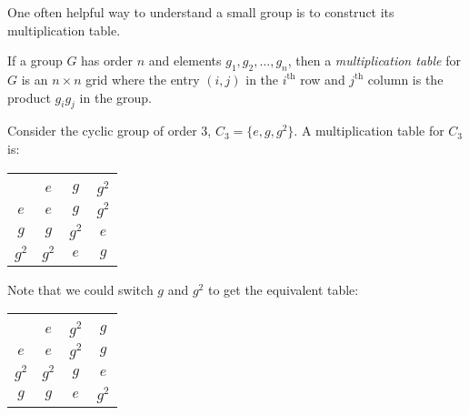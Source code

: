 



One often helpful way to understand a small group is to construct its multiplication table. 

\begin{definition}
   If a group $G$ has order $n$ and elements $g_1,g_2,\ldots,g_n$, then a \emph{multiplication table} for $G$ is an $n \times n$ grid where the entry $(i,j)$ in the $i^{\text{th}}$ row and $j^{\text{th}}$ column is the product $g_ig_j$ in the group.
\end{definition}

\begin{example}
    Consider the cyclic group of order 3, $C_3 = \{e, g, g^2 \}.$ A multiplication table for $C_3$ is:
    \begin{center}
        \begin{tabular}{c| *{3}{c}}
        \multicolumn{4}{c}{} \\
        $\text{ }$ & $e$ & $g$ & $g^2$ \\
        \hline
        $e$ &  $e$ & $g$ & $g^2$ \\
        $g$ & $g$ & $g^2$ & $e$ \\
        $g^2$ & $g^2$ & $e$ & $g$
        \end{tabular}
    \end{center}

    Note that we could switch $g$ and $g^2$ to get the equivalent table:

    \begin{center}
        \begin{tabular}{c| *{3}{c}}
        \multicolumn{4}{c}{} \\
        $\text{ }$ & $e$ & $g^2$ & $g$ \\
        \hline
        $e$ &  $e$ & $g^2$ & $g$ \\
        $g^2$ & $g^2$ & $g$ & $e$ \\
        $g$ & $g$ & $e$ & $g^2$
        \end{tabular}
    \end{center}
    \label{ex:multTable}
\end{example}


